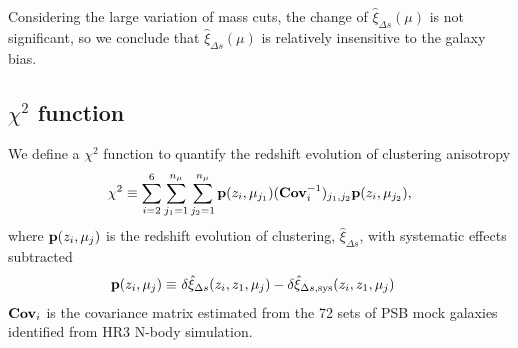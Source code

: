 \documentclass[iop]{emulateapj}
\begin{document}
Considering the large variation of mass cuts, the change of $\hat\xi_{\Delta s}(\mu)$ is not significant,
so we conclude that $\hat\xi_{\Delta s}(\mu)$ is relatively insensitive to the galaxy bias.




\subsection{$\chi^2$ function}\label{sec:likelihood}

We define a $\chi^2$ function to quantify the redshift evolution of clustering anisotropy
\begin{equation}\label{eq:chisq1}
\chi^2\equiv \sum_{i=2}^{6} \sum_{j_1=1}^{n_{\mu}} \sum_{j_2=1}^{n_{\mu}} {\bf p}(z_i,\mu_{j_1}) ({\bf Cov}_{i}^{-1})_{j_1,j_2}  {\bf p}(z_i,\mu_{j_2}),
\end{equation}
where ${\bf p}(z_i,\mu_{j})$ is the redshift evolution of clustering, 
$\hat \xi_{\Delta s}$, with systematic effects subtracted
\begin{eqnarray}\label{eq:bfp}
 {\bf p}(z_i,\mu_{j}) \equiv&\ \delta \hat\xi_{\Delta s}(z_i,z_1,\mu_j) - \delta \hat\xi_{\Delta s, \rm sys}(z_i,z_1,\mu_j)
\end{eqnarray}
${\bf Cov}_i$ is the covariance matrix estimated from the 72 sets of PSB mock galaxies identified from HR3 N-body simulation.




\end{document}
